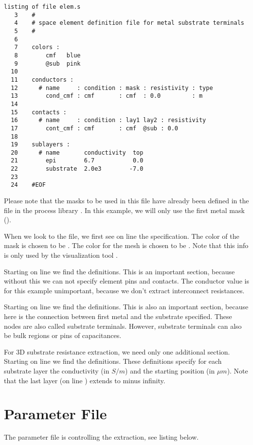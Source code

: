\small \begin{Verbatim}[frame=single]
listing of file elem.s
   3    #
   4    # space element definition file for metal substrate terminals
   5    #
   6
   7    colors :
   8        cmf   blue
   9        @sub  pink
  10
  11    conductors :
  12      # name     : condition : mask : resistivity : type
  13        cond_cmf : cmf       : cmf  : 0.0         : m
  14
  15    contacts :
  16      # name     : condition : lay1 lay2 : resistivity
  17        cont_cmf : cmf       : cmf  @sub : 0.0
  18
  19    sublayers :
  20      # name       conductivity  top
  21        epi        6.7           0.0
  22        substrate  2.0e3        -7.0
  23
  24    #EOF
\end{Verbatim}
\normalsize
Please note that the masks to be used in this file have already been defined
in the  file in the process library .
In this example, we will only use the first metal mask ().

When we look to the file, we first see on line  the  specification.
The color of the  mask is chosen to be .
The color for the  mesh is chosen to be .
Note that this info is only used by the visualization tool .

Starting on line  we find the  definitions.
This is an important section, because without this we can not specify
element pins and contacts.
The conductor value is for this example unimportant,
because we don't extract interconnect resistances.

Starting on line  we find the  definitions.
This is also an important section,
because here is the connection between first metal and the substrate specified.
These nodes are also called substrate terminals.
However, substrate terminals can also be bulk regions or pins of capacitances.

For 3D substrate resistance extraction, we need only one additional section.
Starting on line  we find the  definitions.
These definitions specify for each substrate layer the conductivity (in $S / m$)
and the starting position (in $\mu m$).
Note that the last layer (on line ) extends to minus infinity.

\section{Parameter File}
\label{STparam}
The parameter file  is controlling the extraction, see listing below.

